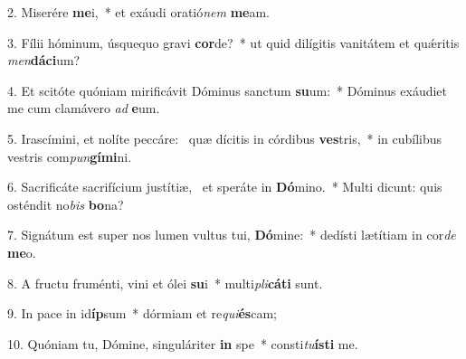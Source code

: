 2. Miserére \textbf{me}i,~*  et exáudi oratió\textit{nem} \textbf{me}am.\

3. Fílii hóminum, úsquequo gravi \textbf{cor}de?~*  ut quid dilígitis vanitátem et quǽritis \textit{men}\textbf{dá}\textbf{ci}um?\

4. Et scitóte quóniam mirificávit Dóminus sanctum \textbf{su}um:~*  Dóminus exáudiet me cum clamávero \textit{ad} \textbf{e}um.\

5. Irascímini, et nolíte peccáre: \dag\  quæ dícitis in córdibus \textbf{ves}tris,~*  in cubílibus vestris com\textit{pun}\textbf{gí}\textbf{mi}ni.\

6. Sacrificáte sacrifícium justítiæ, \dag\  et speráte in \textbf{Dó}mino.~*  Multi dicunt: quis osténdit no\textit{bis} \textbf{bo}na?\

7. Signátum est super nos lumen vultus tui, \textbf{Dó}mine:~*  dedísti lætítiam in cor\textit{de} \textbf{me}o.\

8. A fructu fruménti, vini et ólei \textbf{su}i~*  multi\textit{pli}\textbf{cá}\textbf{ti} sunt.\

9. In pace in id\textbf{íp}sum~*  dórmiam et re\textit{qui}\textbf{és}cam;\

10. Quóniam tu, Dómine, singuláriter \textbf{in} spe~*  consti\textit{tu}\textbf{ís}\textbf{ti} me.\

